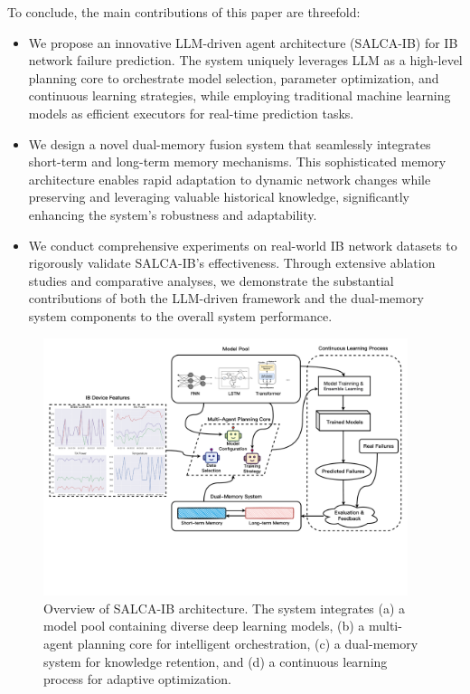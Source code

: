 \documentclass[conference]{IEEEtran}
\begin{document}
To conclude, the main contributions of this paper are threefold:
\begin{itemize}
	\item We propose an innovative LLM-driven agent architecture (SALCA-IB) for IB network failure prediction. The system uniquely leverages LLM as a high-level planning core to orchestrate model selection, parameter optimization, and continuous learning strategies, while employing traditional machine learning models as efficient executors for real-time prediction tasks.
	\item We design a novel dual-memory fusion system that seamlessly integrates short-term and long-term memory mechanisms. This sophisticated memory architecture enables rapid adaptation to dynamic network changes while preserving and leveraging valuable historical knowledge, significantly enhancing the system's robustness and adaptability.
	\item We conduct comprehensive experiments on real-world IB network datasets to rigorously validate SALCA-IB's effectiveness. Through extensive ablation studies and comparative analyses, we demonstrate the substantial contributions of both the LLM-driven framework and the dual-memory system components to the overall system performance.
\end{itemize}

\begin{figure}[htbp]
    \centering
    \includegraphics[width=0.95\textwidth]{fig/agent.pdf}
    \caption{Overview of SALCA-IB architecture. The system integrates (a) a model pool containing diverse deep learning models, (b) a multi-agent planning core for intelligent orchestration, (c) a dual-memory system for knowledge retention, and (d) a continuous learning process for adaptive optimization.}
    \label{fig:salca-ib}
\end{figure}
\end{document}
